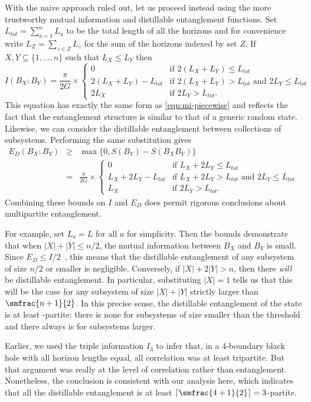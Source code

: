 \documentclass[12pt]{article}
\newcommand{\be}{\begin{equation}}
\newcommand{\ee}{\end{equation}}
\newcommand{\beq}{\begin{eqnarray}}
\newcommand{\eeq}{\end{eqnarray}}
\numberwithin{equation}{section}
\begin{document}
With the naive approach ruled out, let us proceed instead using the more trustworthy mutual information and distillable entanglement functions.
Set $L_{tot} = \sum_{a=1}^n L_a$ to be the total length of all the horizons and for convenience write $L_Z = \sum_{z \in Z} L_z$ for the sum of the horizons indexed by set $Z$.
If $X, Y \subseteq \{ 1, \ldots, n \}$ such that $L_X \leq L_Y$ then
\be
\label{manyBMI}
I(B_X : B_Y ) =
	\frac{\pi}{2G} \times
	\begin{cases}
		0  & \text{if } 2( L_X + L_Y ) \leq  L_{tot} \\
		2(L_X + L_Y) - L_{tot} & \text{if } 2( L_X + L_Y ) > L_{tot}
				\text{ and } 2 L_Y \leq L_{tot} \\
		2 L_X & \text{if } 2 L_Y > L_{tot}.
	\end{cases}
\ee
This equation has exactly the same form as \eqref{eqn:mi-piecewise} and reflects the fact that the entanglement structure is similar to that of a generic random state.
Likewise, we can consider the distillable entanglement between collections of subsystems. Performing the same substitution gives
\beq
E_D(B_X : B_Y )
&\geq& \max\{ 0, S( B_Y ) - S( B_X B_Y ) \} \\
&=& \nonumber
	\frac{\pi}{2G} \times
	\begin{cases}
		0 & \text{if } L_X + 2 L_Y \leq L_{tot} \\
		L_X + 2 L_Y - L_{tot} & \text{if } L_X + 2 L_Y > L_{tot} \text{ and } 2 L_Y \leq L_{tot} \\
		L_X & \text{if } 2 L_Y > L_{tot}.
	\end{cases}
\eeq
Combining these bounds on $I$ and $E_D$ does permit rigorous conclusions about multipartite entanglement.

For example, set $L_a = L$ for all $a$ for simplicity. Then the bounds demonstrate that when $|X|+|Y| \leq n / 2$, the mutual information between $B_X$ and $B_Y$ is small. Since $E_D \leq I/ 2$~\cite{christandl2004squashed}, this means that the distillable entanglement of any subsystem of size $n/2$ or smaller is negligible. Conversely, if $|X| + 2|Y| > n$, then there \emph{will} be distillable entanglement. In particular, substituting $|X|=1$ tells us that this will be the case for any subsystem of size $|X|+|Y|$ strictly larger than $\smfrac{n+1}{2}$. In this precise sense, the distillable entanglement of the state is at least -partite: there is none for subsystems of size smaller than the threshold and there always is for subsystems larger.

Earlier, we used the triple information $I_3$ to infer that, in a 4-boundary black hole with all horizon lengths equal, all correlation was at least tripartite.  But that argument was really at the level of correlation rather than entanglement. Nonetheless, the conclusion is consistent with our analysis here, which indicates that all the distillable entanglement is at least $\lceil \smfrac{4+1}{2} \rceil = 3$-partite.
\end{document}
